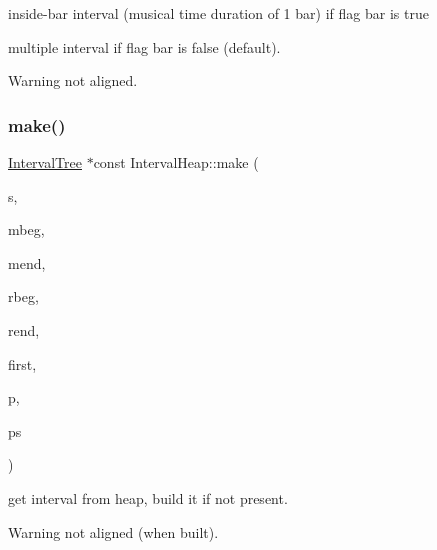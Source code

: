 \begin{DoxyItemize}
\item inside-\/bar interval (musical time duration of 1 bar) if flag bar is true
\item multiple interval if flag bar is false (default).
\end{DoxyItemize}

\begin{DoxyWarning}{Warning}
not aligned. 
\end{DoxyWarning}
\mbox{\label{group__segment_gad886d53d2881a80f06c6f9fbf202d727}} 
\subsubsection{\texorpdfstring{make()}{make()}\hspace{0.1cm}{\footnotesize\ttfamily [2/2]}}
{\footnotesize\ttfamily \mbox{\hyperlink{classIntervalTree}{Interval\+Tree}} $\ast$const Interval\+Heap\+::make (\begin{DoxyParamCaption}\item[{const \mbox{\hyperlink{classInputSegment}{Input\+Segment}} $\ast$}]{s,  }\item[{\mbox{\hyperlink{classRational}{Rational}}}]{mbeg,  }\item[{\mbox{\hyperlink{classRational}{Rational}}}]{mend,  }\item[{double}]{rbeg,  }\item[{double}]{rend,  }\item[{size\+\_\+t}]{first,  }\item[{\mbox{\hyperlink{classIntervalTree}{Interval\+Tree}} $\ast$}]{p,  }\item[{\mbox{\hyperlink{classIntervalTree}{Interval\+Tree}} $\ast$}]{ps }\end{DoxyParamCaption})}



get interval from heap, build it if not present. 

\begin{DoxyWarning}{Warning}
not aligned (when built). 
\end{DoxyWarning}
\mbox{\label{group__segment_gab092e4338aa4c3369c4fa4404d8706b0}} 
